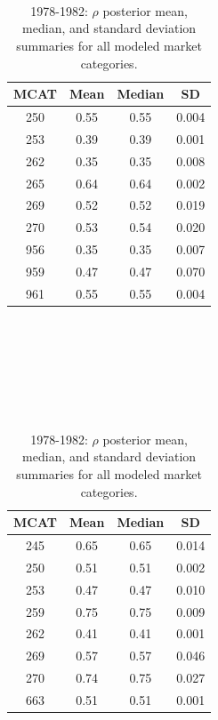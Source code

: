 \documentclass[12pt]{article}
\begin{document}
%
\begin{table}[h!]
\begin{minipage}[c]{0.45\textwidth}
\centering
$~$\\$~$\\$~$\\
\begin{tabular}{cccc}
\hline
MCAT & Mean & Median & SD     \\ \hline
250 & 0.55 & 0.55 & 0.004       \\
253 & 0.39 & 0.39 & 0.001       \\
262 & 0.35 & 0.35 & 0.008       \\
265 & 0.64 & 0.64 & 0.002       \\
269 & 0.52 & 0.52 & 0.019       \\
270 & 0.53 & 0.54 & 0.020       \\
956 & 0.35 & 0.35 & 0.007       \\
959 & 0.47 & 0.47 & 0.070       \\
961 & 0.55 & 0.55 & 0.004       \\
\hline
\end{tabular}
$~$\\$~$\\$~$\\$~$\\
\caption{1978-1982: $\rho$ posterior mean, median, and standard deviation summaries for 
all modeled market categories.}%
\label{rho78}
\end{minipage}
\begin{minipage}[c]{0.09\textwidth}
$~$
\end{minipage}
\begin{minipage}[c]{0.45\textwidth} 
\centering
\begin{tabular}{cccc}
\hline
MCAT & Mean & Median & SD     \\ \hline
245 & 0.65 & 0.65 & 0.014       \\
250 & 0.51 & 0.51 & 0.002       \\
253 & 0.47 & 0.47 & 0.010       \\
259 & 0.75 & 0.75 & 0.009       \\
262 & 0.41 & 0.41 & 0.001       \\
269 & 0.57 & 0.57 & 0.046       \\
270 & 0.74 & 0.75 & 0.027       \\
663 & 0.51 & 0.51 & 0.001       \\

\end{tabular}
\end{minipage}
\end{table}
\end{document}
